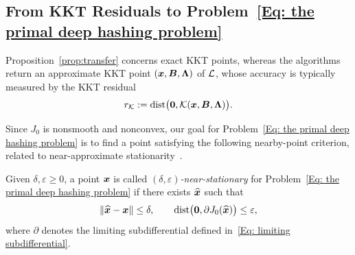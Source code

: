 \subsection{From KKT Residuals to Problem~\eqref{Eq: the primal deep hashing problem}}
\label{Sec: original objective guarantees}
\begingroup\color{blue}
Proposition~\ref{prop:transfer} concerns exact KKT points, whereas the algorithms return an approximate KKT point $(\bm{x},\bm{B},\bm{\Lambda})$ of $\mathcal{L}$, whose accuracy is typically measured by the KKT residual
\begin{align}
    \label{Eq: kkt residual}
r_{\mathcal{K}}:=\operatorname{dist}\bigl(\bm{0},\mathcal{K}(\bx,\bB,\bLmbd)\bigr).
\end{align} 

Since $J_0$ is nonsmooth and nonconvex, our goal for Problem~\eqref{Eq: the primal deep hashing problem} is to find a point satisfying the following nearby-point criterion, related to near-approximate stationarity~\cite[Definition~2.5]{tian2022stationarity}.
\begin{definition}\label{def:near-stationarity}
Given $\delta,\varepsilon\ge0$, a point $\bm{x}$ is called \emph{$(\delta,\varepsilon)$-near-stationary} for Problem~\eqref{Eq: the primal deep hashing problem} if there exists $\widehat{\bm{x}}$ such that
\begin{equation}\label{eq:near-stationarity}
\|\widehat{\bx}-\bx\|\le\delta,
\qquad
\operatorname{dist}\bigl(\bm{0},\partial J_0(\widehat{\bx})\bigr)\le\varepsilon,
\end{equation}
where $\partial$ denotes the limiting subdifferential defined in~\eqref{Eq: limiting subdifferential}.
\end{definition}

